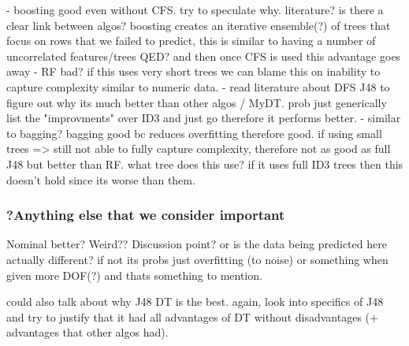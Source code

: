 - boosting good even without CFS. try to speculate why. literature? is there a clear link between algos? boosting creates an iterative ensemble(?) of trees that focus on rows that we failed to predict, this is similar to having a number of uncorrelated features/trees QED? and then once CFS is used this advantage goes away
- RF bad? if this uses very short trees we can blame this on inability to capture complexity similar to numeric data.
- read literature about DFS J48 to figure out why its much better than other algos / MyDT. prob just generically list the "improvments" over ID3 and just go therefore it performs better.
- similar to bagging? bagging good bc reduces overfitting therefore good. if using small trees => still not able to fully capture complexity, therefore not as good as full J48 but better than RF. what tree does this use? if it uses full ID3 trees then this doesn't hold since its worse than them.


\subsubsection{?Anything else that we consider important}

Nominal better? Weird?? Discussion point?
or is the data being predicted here actually different? if not its probs just overfitting (to noise) or something when given more DOF(?) and thats something to mention.


could also talk about why J48 DT is the best. again, look into specifics of J48 and try to justify that it had all advantages of DT without disadvantages (+ advantages that other algos had).
